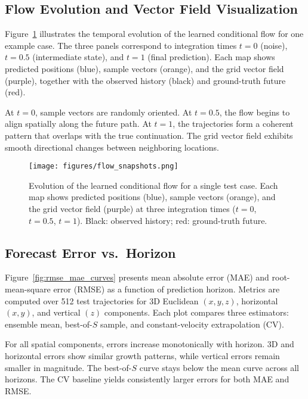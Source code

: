 \documentclass[
  manuscript=proceedings,  %
  layout=preprint,  %
  year=20xx,
  volume=x,
]{extra/joas}
\begin{document}
\subsection{Flow Evolution and Vector Field Visualization}
\label{subsec:flow-evolution}

Figure~\ref{fig:flow_snapshots} illustrates the temporal evolution of the learned conditional flow for one example case.
The three panels correspond to integration times $t{=}0$ (noise), $t{=}0.5$ (intermediate state), and $t{=}1$ (final prediction).
Each map shows predicted positions (blue), sample vectors (orange), and the grid vector field (purple), together with the observed history (black) and ground-truth future (red).

At $t{=}0$, sample vectors are randomly oriented.
At $t{=}0.5$, the flow begins to align spatially along the future path.
At $t{=}1$, the trajectories form a coherent pattern that overlaps with the true continuation.
The grid vector field exhibits smooth directional changes between neighboring locations.

\begin{figure}[hbt]
\centering
\texttt{[image: figures/flow\_snapshots.png]}
\caption{Evolution of the learned conditional flow for a single test case.
Each map shows predicted positions (blue), sample vectors (orange), and the grid vector field (purple) at three integration times ($t{=}0$, $t{=}0.5$, $t{=}1$).
Black: observed history; red: ground-truth future.}
\label{fig:flow_snapshots}
\end{figure}

\subsection{Forecast Error vs.~Horizon}
\label{subsec:deterministic-accuracy}

Figure~\ref{fig:rmse_mae_curves} presents mean absolute error (MAE) and root-mean-square error (RMSE) as a function of prediction horizon.
Metrics are computed over 512 test trajectories for 3D Euclidean $(x,y,z)$, horizontal $(x,y)$, and vertical $(z)$ components.
Each plot compares three estimators: ensemble mean, best-of-$S$ sample, and constant-velocity extrapolation (CV).

For all spatial components, errors increase monotonically with horizon.
3D and horizontal errors show similar growth patterns, while vertical errors remain smaller in magnitude.
The best-of-$S$ curve stays below the mean curve across all horizons.
The CV baseline yields consistently larger errors for both MAE and RMSE.
\end{document}
